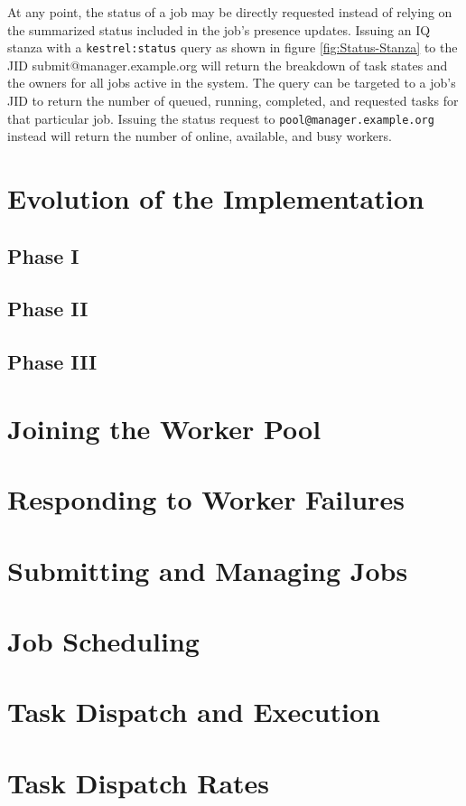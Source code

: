 At any point, the status of a job may be directly requested instead
of relying on the summarized status included in the job's presence
updates. Issuing an IQ stanza with a \texttt{kestrel:status} query
as shown in figure \ref{fig:Status-Stanza} to the JID submit@manager.example.org
will return the breakdown of task states and the owners for all jobs
active in the system. The query can be targeted to a job's JID to
return the number of queued, running, completed, and requested tasks
for that particular job. Issuing the status request to \texttt{pool@manager.example.org}
instead will return the number of online, available, and busy workers.


\section{Evolution of the Implementation}

\subsection{Phase I}

\subsection{Phase II}

\subsection{Phase III}

\section{Joining the Worker Pool}

\section{Responding to Worker Failures}

\section{Submitting and Managing Jobs}

\section{Job Scheduling}

\section{Task Dispatch and Execution}

\section{Task Dispatch Rates}
